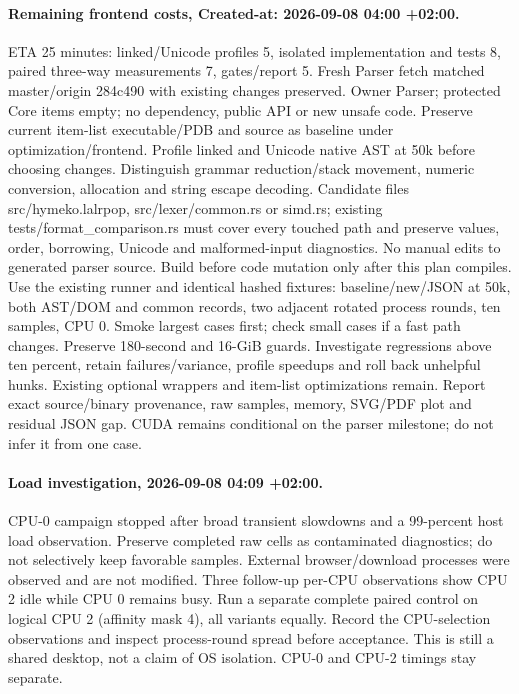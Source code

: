 \documentclass[11pt,a4paper]{article}
\begin{document}
\paragraph{Remaining frontend costs, Created-at: 2026-09-08 04:00 +02:00.}
ETA 25 minutes: linked/Unicode profiles 5, isolated implementation and tests 8,
paired three-way measurements 7, gates/report 5. Fresh Parser fetch matched
master/origin 284c490 with existing changes preserved. Owner Parser; protected
Core items empty; no dependency, public API or new unsafe code. Preserve current
item-list executable/PDB and source as baseline under optimization/frontend.
Profile linked and Unicode native AST at 50k before choosing changes. Distinguish
grammar reduction/stack movement, numeric conversion, allocation and string escape
decoding. Candidate files src/hymeko.lalrpop, src/lexer/common.rs or simd.rs;
existing tests/format\_comparison.rs must cover every touched path and preserve
values, order, borrowing, Unicode and malformed-input diagnostics. No manual edits
to generated parser source. Build before code mutation only after this plan
compiles. Use the existing runner and identical hashed fixtures: baseline/new/JSON
at 50k, both AST/DOM and common records, two adjacent rotated process rounds,
ten samples, CPU 0. Smoke largest cases first; check small cases if a fast path
changes. Preserve 180-second and 16-GiB guards. Investigate regressions above ten
percent, retain failures/variance, profile speedups and roll back unhelpful hunks.
Existing optional wrappers and item-list optimizations remain. Report exact
source/binary provenance, raw samples, memory, SVG/PDF plot and residual JSON gap.
CUDA remains conditional on the parser milestone; do not infer it from one case.
\paragraph{Load investigation, 2026-09-08 04:09 +02:00.}
CPU-0 campaign stopped after broad transient slowdowns and a 99-percent host
load observation. Preserve completed raw cells as contaminated diagnostics;
do not selectively keep favorable samples. External browser/download processes
were observed and are not modified. Three follow-up per-CPU observations show
CPU 2 idle while CPU 0 remains busy. Run a separate complete paired control on
logical CPU 2 (affinity mask 4), all variants equally. Record the CPU-selection
observations and inspect process-round spread before acceptance. This is still
a shared desktop, not a claim of OS isolation. CPU-0 and CPU-2 timings stay separate.
\end{document}
